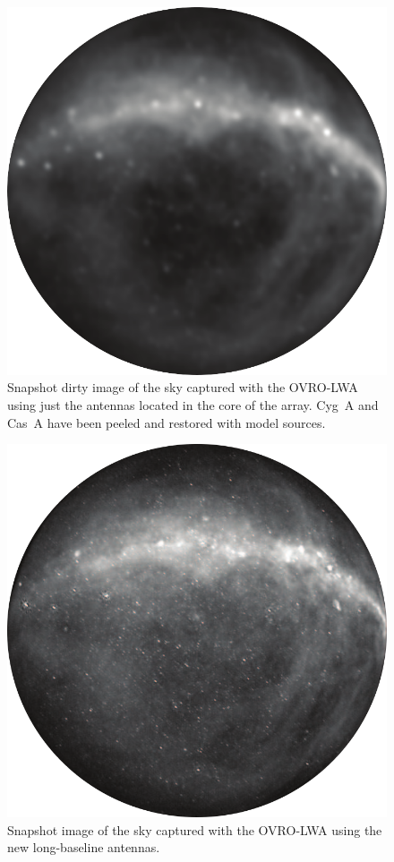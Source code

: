 \begin{bibunit}
\begin{figure}[t]
    \centering
    \includegraphics[width=\textwidth]{figures/chapter2/before-expansion}
    \caption{
        Snapshot dirty image of the sky captured with the OVRO-LWA using just the antennas located
        in the core of the array. Cyg~A and Cas~A have been peeled and restored with model sources.
    }
    \label{fig:core-snapshot-image}
\end{figure}

\begin{figure}[t]
    \centering
    \includegraphics[width=\textwidth]{figures/chapter2/after-expansion}
    \caption{
        Snapshot image of the sky captured with the OVRO-LWA using the new long-baseline antennas.
    }
    \label{fig:expansion-snapshot-image}
\end{figure}


\end{bibunit}
